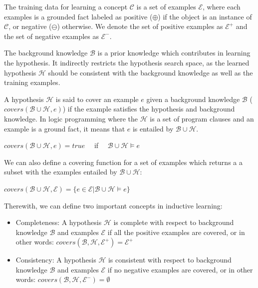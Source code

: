 The training data for learning a concept $\mathcal{C}$ is a set of examples $\mathcal{E}$, where each examples is a
grounded fact
labeled as positive ($\oplus$) if the object is an instance of $\mathcal{C}$, or negative ($\ominus$) otherwise. We
denote the set
of positive examples as $\mathcal{E}^{+}$ and the set of negative examples as $\mathcal{E}^{-}$.

The background knowledge $\mathcal{B}$ is a prior knowledge which contributes in learning the hypothesis. It
indirectly
restricts the hypothesis search space, as  the learned hypothesis $\mathcal{H}$ should be consistent with the
background
knowledge as well as the training examples.

A hypothesis $\mathcal{H}$ is said to cover an example $e$ given a background knowledge
$\mathcal{B}$ ($covers(\mathcal{B} \cup \mathcal{H},e)$) if the example satisfies the hypothesis and background
knowledge. In logic programming where the $\mathcal{H}$ is a set of program clauses and an example is a ground fact,
it
means that $e$ is entailed by $\mathcal{B} \cup \mathcal{H}$.

\begin{center}
 $covers(\mathcal{B} \cup \mathcal{H},e)=true \quad$ if $\quad \mathcal{B} \cup \mathcal{H} \models e$
\end{center}

We can also define a covering function for a set of examples which returns a a subset with the examples entailed by
$\mathcal{B} \cup \mathcal{H}$:

\begin{center}
 $covers(\mathcal{B} \cup \mathcal{H},\mathcal{E})=\{e \in \mathcal{E} | \mathcal{B} \cup \mathcal{H} \models e\}$
\end{center}

Therewith, we can define two important concepts in inductive learning:

\begin{itemize}
 \item Completeness: A hypothesis $\mathcal{H}$ is complete with respect to background knowledge $\mathcal{B}$ and
examples $\mathcal{E}$ if all the positive examples are covered, or in other words:
$covers(\mathcal{B},\mathcal{H},\mathcal{E}^{+})=\mathcal{E}^{+}$
 \item Consistency: A hypothesis $\mathcal{H}$ is consistent with respect to background knowledge $\mathcal{B}$ and
examples $\mathcal{E}$ if no negative examples are covered, or in other words:
$covers(\mathcal{B},\mathcal{H},\mathcal{E}^{-})=\emptyset$
\end{itemize}


